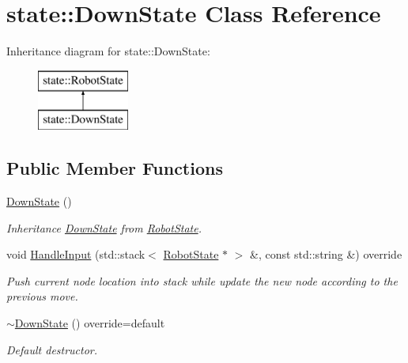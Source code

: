\hypertarget{classstate_1_1_down_state}{}\section{state\+::Down\+State Class Reference}
\label{classstate_1_1_down_state}
Inheritance diagram for state\+::Down\+State\+:\begin{figure}[H]
\begin{center}
\leavevmode
\includegraphics[height=2.000000cm]{classstate_1_1_down_state}
\end{center}
\end{figure}
\subsection*{Public Member Functions}
\begin{DoxyCompactItemize}
\item 
\mbox{\label{classstate_1_1_down_state_a05809d472eae746b024ee38cb0658b4a}} 
\mbox{\hyperlink{classstate_1_1_down_state_a05809d472eae746b024ee38cb0658b4a}{Down\+State}} ()
\begin{DoxyCompactList}\small\item\em Inheritance \mbox{\hyperlink{classstate_1_1_down_state}{Down\+State}} from \mbox{\hyperlink{classstate_1_1_robot_state}{Robot\+State}}. \end{DoxyCompactList}\item 
\mbox{\label{classstate_1_1_down_state_a6b88c8daa7c19c8056abb98891a3edf6}} 
void \mbox{\hyperlink{classstate_1_1_down_state_a6b88c8daa7c19c8056abb98891a3edf6}{Handle\+Input}} (std\+::stack$<$ \mbox{\hyperlink{classstate_1_1_robot_state}{Robot\+State}} $\ast$ $>$ \&, const std\+::string \&) override
\begin{DoxyCompactList}\small\item\em Push current node location into stack while update the new node according to the previous move. \end{DoxyCompactList}\item 
\mbox{\label{classstate_1_1_down_state_a48148b5c21f4d0f3b90391dcd19219e1}} 
\mbox{\hyperlink{classstate_1_1_down_state_a48148b5c21f4d0f3b90391dcd19219e1}{$\sim$\+Down\+State}} () override=default
\begin{DoxyCompactList}\small\item\em Default destructor. \end{DoxyCompactList}\end{DoxyCompactItemize}


